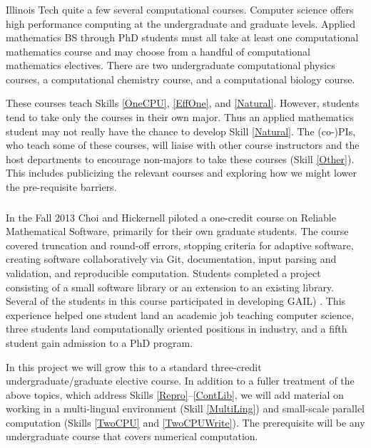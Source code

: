 \documentclass[11pt]{NSFamsart}
\begin{document}
\subsubsection{\CurrExistName} \label{CurrExist} Illinois Tech quite a few several computational courses.  Computer science offers high performance computing at the undergraduate and graduate levels.  Applied mathematics BS through PhD students must all take at least one computational mathematics course and may choose from a handful of computational mathematics electives. There are two undergraduate computational physics courses, a computational chemistry course, and a computational biology course.

These courses teach Skills \ref{OneCPU}, \ref{EffOne}, and \ref{Natural}.  However, students tend to take only the courses in their own major.  Thus an applied mathematics student may not really have the chance to develop Skill \ref{Natural}.  The (co-)PIs, who teach some of these courses, will liaise  with other course instructors and the host departments to encourage non-majors to take these courses (Skill \ref{Other}).  This includes publicizing the relevant courses and exploring how we might lower the pre-requisite barriers.


\subsubsection{\RelSoftName} \label{RelSoft} In the Fall 2013 Choi and Hickernell piloted a one-credit course on Reliable Mathematical Software, primarily for their own graduate students.  The course covered truncation and round-off errors,
stopping criteria for adaptive software,
creating software collaboratively via Git, 
documentation,
input parsing and validation, and
reproducible computation.
Students completed a project consisting of a small software library or an extension to an existing library.  Several of the students in this course participated in developing GAIL) \cite{ChoEtal17b}.  This experience helped one student land an academic job teaching computer science, three students land computationally oriented positions in industry, and a fifth student gain admission to a PhD program.

In this project we will grow this to a standard three-credit undergraduate/graduate elective course.  In addition to a fuller treatment of the above topics, which address Skills \ref{Repro}--\ref{ContLib}, we will add material on working in a multi-lingual environment (Skill \ref{MultiLing}) and small-scale parallel computation (Skills \ref{TwoCPU} and \ref{TwoCPUWrite}).  The prerequisite will be any undergraduate course that covers numerical computation.
\end{document}
